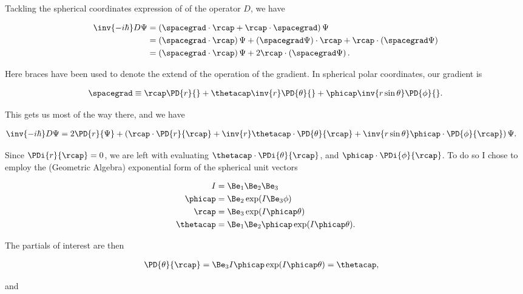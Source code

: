 Tackling the spherical coordinates expression of of the operator $D$, we have

\begin{align*}
\inv{-i\hbar} D \Psi 
&= \left( \spacegrad \cdot \rcap + \rcap \cdot \spacegrad \right) \Psi \\
&= 
\left( \spacegrad \cdot \rcap \right) \Psi 
+ \left( \spacegrad \Psi \right) \cdot \rcap 
+ \rcap \cdot \left(\spacegrad \Psi\right) \\
&=
\left( \spacegrad \cdot \rcap \right) \Psi 
+ 2 \rcap \cdot \left( \spacegrad \Psi \right).
\end{align*}

Here braces have been used to denote the extend of the operation of the gradient.  In spherical polar coordinates, our gradient is

\begin{align*}
\spacegrad \equiv 
\rcap \PD{r}{}
+\thetacap \inv{r} \PD{\theta}{}
+\phicap \inv{r \sin\theta} \PD{\phi}{}.
\end{align*}

This gets us most of the way there, and we have

\begin{align*}
\inv{-i\hbar} D \Psi 
&=
2 \PD{r}{\Psi} 
+ 
\left( 
\rcap \cdot \PD{r}{\rcap}
+\inv{r} \thetacap \cdot \PD{\theta}{\rcap}
+\inv{r \sin\theta} \phicap \cdot \PD{\phi}{\rcap}
\right) \Psi.
\end{align*}

Since $\PDi{r}{\rcap} = 0$, we are left with evaluating $\thetacap \cdot \PDi{\theta}{\rcap}$, and $\phicap \cdot \PDi{\phi}{\rcap}$.  To do so I chose to employ the (Geometric Algebra) exponential form of the spherical unit vectors \cite{sphericalPolarUnit}

\begin{align*}
I &= \Be_1 \Be_2 \Be_3 \\
\phicap &= \Be_{2} \exp( I \Be_3 \phi ) \\
\rcap &= \Be_3 \exp( I \phicap \theta ) \\
\thetacap &= \Be_1 \Be_2 \phicap \exp( I \phicap \theta ).
\end{align*}

The partials of interest are then

\begin{align*}
\PD{\theta}{\rcap} &= \Be_3 I \phicap \exp( I \phicap \theta ) = \thetacap,
\end{align*}

and

